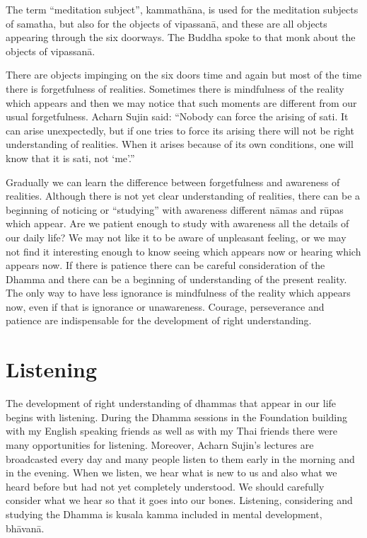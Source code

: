 The term ``meditation subject'', kammathāna, is used for the meditation subjects of samatha, but also for the objects of vipassanā, and these are all objects appearing through the six doorways. The Buddha spoke to that monk about the objects of vipassanā.

There are objects impinging on the six doors time and again but most of the time there is forgetfulness of realities. Sometimes there is mindfulness of the reality which appears and then we may notice that such moments are different from our usual forgetfulness. Acharn Sujin said: ``Nobody can force the arising of sati. It can arise unexpectedly, but if one tries to force its arising there will not be right understanding of realities. When it arises because of its own conditions, one will know that it is sati, not ‘me’.''

Gradually we can learn the difference between forgetfulness and awareness of realities. Although there is not yet clear understanding of realities, there can be a beginning of noticing or ``studying'' with awareness different nāmas and rūpas which appear. Are we patient enough to study with awareness all the details of our daily life? We may not like it to be aware of unpleasant feeling, or we may not find it interesting enough to know seeing which appears now or hearing which appears now. If there is patience there can be careful consideration of the Dhamma and there can be a beginning of understanding of the present reality. The only way to have less ignorance is mindfulness of the reality which appears now, even if that is ignorance or unawareness. Courage, perseverance and patience are indispensable for the development of right understanding.



\chapter{Listening}

The development of right understanding of dhammas that appear in our life begins with listening. During the Dhamma sessions in the Foundation building with my English speaking friends as well as with my Thai friends there were many opportunities for listening. Moreover, Acharn Sujin’s lectures are broadcasted every day and many people listen to them early in the morning and in the evening. When we listen, we hear what is new to us and also what we heard before but had not yet completely understood. We should carefully consider what we hear so that it goes into our bones. Listening, considering and studying the Dhamma is kusala kamma included in mental development, bhāvanā.

